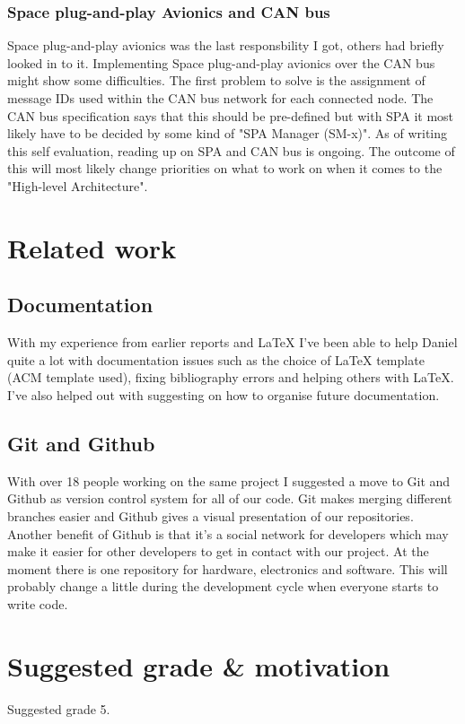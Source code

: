 \subsubsection{Space plug-and-play Avionics and CAN bus}
Space plug-and-play avionics was the last responsbility I got, others had briefly
looked in to it. Implementing Space plug-and-play avionics
over the CAN bus might show some difficulties. The first problem to solve is
the assignment of message IDs used within the CAN bus network for each connected
node. The CAN bus specification \cite{web:canspec} says that this should be pre-defined but with
SPA it most likely have to be decided by some kind of "SPA Manager (SM-x)". As of
writing this self evaluation, reading up on SPA and CAN bus is ongoing. The
outcome of this will most likely change priorities on what to work on when it
comes to the "High-level Architecture".

\section{Related work}
\subsection{Documentation}
With my experience from earlier reports and LaTeX I've been able to help Daniel
quite a lot with documentation issues such as the choice of LaTeX template
(ACM template used), fixing bibliography errors and helping
others with LaTeX. I've also helped out with suggesting on how to organise
future documentation.

\subsection{Git and Github}
With over 18 people working on the same project I suggested a move to Git and
Github as version control system for all of our code. Git makes merging
different branches easier and Github gives a visual presentation of our
repositories. Another benefit of Github is that it's a social network for
developers which may make it easier for other developers to get in contact
with our project. At the moment there is one repository for hardware, electronics
and software. This will probably change a little during the development cycle
when everyone starts to write code.

\section{Suggested grade \& motivation}
Suggested grade 5.

